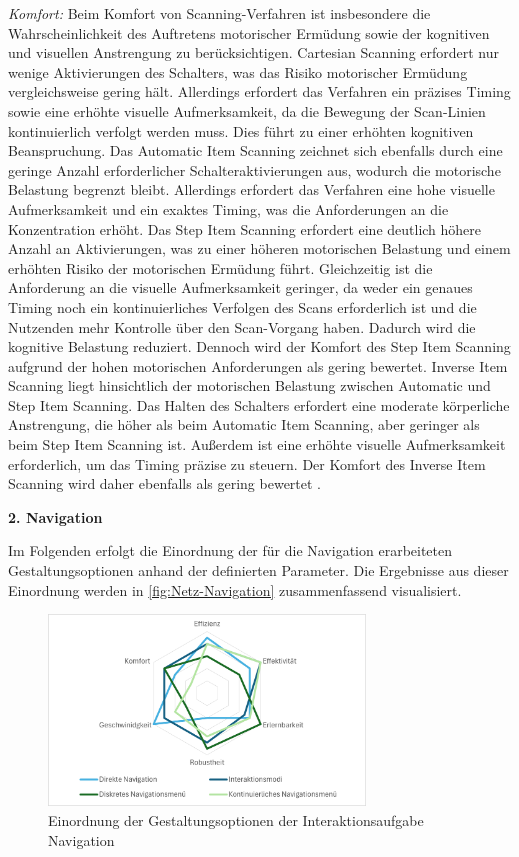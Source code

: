 \textit{Komfort:} 
Beim Komfort von Scanning-Verfahren ist insbesondere die Wahrscheinlichkeit des Auftretens motorischer Ermüdung sowie der kognitiven und visuellen Anstrengung zu berücksichtigen.
Cartesian Scanning erfordert nur wenige Aktivierungen des Schalters, was das Risiko motorischer Ermüdung vergleichsweise gering hält. Allerdings erfordert das Verfahren ein präzises Timing sowie eine erhöhte visuelle Aufmerksamkeit, da die Bewegung der Scan-Linien kontinuierlich verfolgt werden muss. Dies führt zu einer erhöhten kognitiven Beanspruchung. Das Automatic Item Scanning zeichnet sich ebenfalls durch eine geringe Anzahl erforderlicher Schalteraktivierungen aus, wodurch die motorische Belastung begrenzt bleibt. Allerdings erfordert das Verfahren eine hohe visuelle Aufmerksamkeit und ein exaktes Timing, was die Anforderungen an die Konzentration erhöht. Das Step Item Scanning erfordert eine deutlich höhere Anzahl an Aktivierungen, was zu einer höheren motorischen Belastung und einem erhöhten Risiko der motorischen Ermüdung führt. Gleichzeitig ist die Anforderung an die visuelle Aufmerksamkeit geringer, da weder ein genaues Timing noch ein kontinuierliches Verfolgen des Scans erforderlich ist und die Nutzenden mehr Kontrolle über den Scan-Vorgang haben. Dadurch wird die kognitive Belastung reduziert. Dennoch wird der Komfort des Step Item Scanning aufgrund der hohen motorischen Anforderungen als gering bewertet. Inverse Item Scanning liegt hinsichtlich der motorischen Belastung zwischen Automatic und Step Item Scanning. Das Halten des Schalters erfordert eine moderate körperliche Anstrengung, die höher als beim Automatic Item Scanning, aber geringer als beim Step Item Scanning ist. Außerdem ist eine erhöhte visuelle Aufmerksamkeit erforderlich, um das Timing präzise zu steuern. Der Komfort des Inverse Item Scanning wird daher ebenfalls als gering bewertet \citep{COOK2015117}.

\textbf{2. Navigation} 

Im Folgenden erfolgt die Einordnung der für die Navigation erarbeiteten Gestaltungsoptionen anhand der definierten Parameter. Die Ergebnisse aus dieser Einordnung werden in \autoref{fig:Netz-Navigation} zusammenfassend visualisiert. 

\begin{figure}[tbh]
    \centering
    \includegraphics[width=0.75\textwidth]{images/Netzdiagramm-Navigation.png}
    \caption{Einordnung der Gestaltungsoptionen der Interaktionsaufgabe Navigation}
    \label{fig:Netz-Navigation}
\end{figure}

